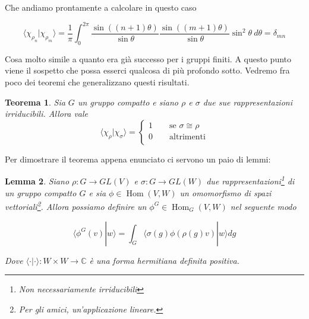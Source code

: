 \documentclass[11pt]{article}
\theoremstyle{plain}
\newtheorem{thm}{Teorema}[section]
\newtheorem{lemma}[thm]{Lemma}
\theoremstyle{definition}
\theoremstyle{remark}
\newcommand{\C}{\mathbb{C}}
\newcommand{\dint}{\displaystyle\int}
\DeclareMathOperator{\Hom}{Hom}
\begin{document}
 Che andiamo prontamente a calcolare in questo caso

 \[
 \langle \chi_{\rho_n} | \chi_{\rho_m} \rangle = \dfrac{1}{\pi}\dint_0^{2\pi} \dfrac{\sin((n+1)\theta)}{\sin\theta} \dfrac{\sin((m+1)\theta)}{\sin\theta} \sin^2\theta \ d\theta = \delta_{mn}
 \]


 Cosa molto simile a quanto era già successo per i gruppi finiti. A questo punto viene il sospetto che possa esserci qualcosa di più profondo sotto. Vedremo fra poco dei teoremi che generalizzano questi risultati. 








 \begin{thm}
   \label{thm:ortogonalita compatto}
   Sia $G$ un gruppo compatto  e siano $\rho$ e $\sigma$ due sue rappresentazioni irriducibili. Allora vale
   \[
   \langle \chi_\rho | \chi_\sigma \rangle =
   \begin{cases}
     1 \qquad \text{se } \sigma \cong \rho \\
     0 \qquad \text{altrimenti} \\
   \end{cases}
   \]
 \end{thm}

 Per dimostrare il teorema appena enunciato ci servono un paio di lemmi:

 \begin{lemma}
   Siano $\rho: G \to GL(V)$ e $\sigma: G \to GL(W)$ due rappresentazioni\footnote{Non necessariamente irriducibili} di un gruppo compatto $G$ e sia $\phi \in \Hom(V, W)$ un omomorfismo di spazi vettoriali\footnote{Per gli amici, un'applicazione lineare.}. Allora possiamo definire un $\phi^G \in \Hom_G(V, W) $ nel seguente modo

   \[ \langle \phi^G(v) | w \rangle = \dint_G \langle \sigma(g) \phi (\rho(g) v) | w\rangle dg\]

   Dove $\langle \cdot | \cdot \rangle : W \times W \to \C$ è una forma hermitiana definita positiva.
   
 \end{lemma}
\end{document}
